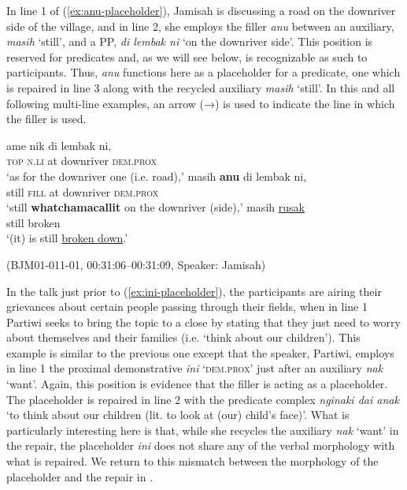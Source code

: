 \documentclass[output=paper,
\ChapterDOI{10.5281/zenodo.15697583}
colorlinks,
citecolor=brown]{langscibook}
\begin{document}
In line 1 of (\ref{ex:anu-placeholder}), Jamisah is discussing a road on the downriver side of the village, and in line 2, she employs the filler \textit{anu} between an auxiliary, \textit{masih} `still', and a PP, \textit{di lembak ni} `on the downriver side'. This position is reserved for predicates and, as we will see below, is recognizable as such to participants. Thus, \textit{anu} functions here as a placeholder for a predicate, one which is repaired in line 3 along with the recycled auxiliary \textit{masih} `still'. In this and all following multi-line examples, an arrow (→) is used to indicate the line in which the filler is used.  

\begin{exe}
    \ex\label{ex:anu-placeholder} 
    \begin{xlist}[0\quad →A:]
        \gll ame nik di lembak ni,\\
        \textsc{top} \textsc{n.li} at downriver \textsc{dem.prox}\\
        \trans `as for the downriver one (i.e. road),'
        \gll masih \textbf{anu} di lembak ni,\\
        still \textsc{fill} at downriver \textsc{dem.prox}\\
        \trans `still \textbf{whatchamacallit} on the downriver (side),'
        \exi{3\quad \hphantom{→J:}}
        \gll  masih \uline{rusak}\\
        still broken\\
        \trans `(it) is still \uline{broken down}.'
    \end{xlist}
    \hfill (BJM01-011-01, 00:31:06--00:31:09, Speaker: Jamisah)
\end{exe}

In the talk just prior to (\ref{ex:ini-placeholder}), the participants are airing their grievances about certain people passing through their fields, when in line 1 Partiwi seeks to bring the topic to a close by stating that they just need to worry about themselves and their families (i.e. `think about our children'). This example is similar to the previous one except that the speaker, Partiwi, employs in line 1 the proximal demonstrative \textit{ini} `\textsc{dem.prox}' just after an auxiliary \textit{nak} `want'. Again, this position is evidence that the filler is acting as a placeholder. The placeholder is repaired in line 2 with the predicate complex \textit{nginaki dai anak} `to think about our children (lit. to look at (our) child's face)'. What is particularly interesting here is that, while she recycles the auxiliary \textit{nak} `want' in the repair, the placeholder \textit{ini} does not share any of the verbal morphology with what is repaired. We return to this mismatch between the morphology of the placeholder and the repair in .
\end{document}
